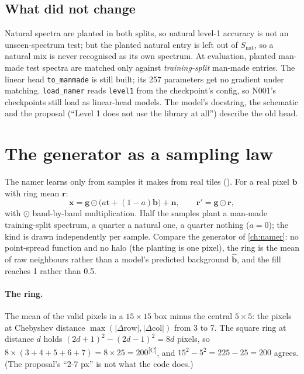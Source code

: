\documentclass[11pt,a4paper,oneside,openany]{book}
\newcommand{\B}[1]{{\symbf{#1}}}
\newcommand{\B}[1]{{\bm{#1}}}
\newcommand{\comp}{\textsuperscript{\textsf{\scriptsize[C]}}}
\newcommand{\vx}{\B{x}}
\newcommand{\vt}{\B{t}}
\newcommand{\vb}{\B{b}}
\newcommand{\vbh}{\hat{\B{b}}}
\newcommand{\vr}{\B{r}}
\newcommand{\vn}{\B{n}}
\newcommand{\vg}{\B{g}}
\begin{document}
\subsection{What did not change}

Natural spectra are planted in both splits, so natural level-1 accuracy is not an unseen-spectrum test; but the planted natural entry is left out of $S_{\mathrm{nat}}$, so a
natural mix is never recognised as its own spectrum. At evaluation, planted man-made test spectra are matched only against \emph{training-split} man-made entries. The linear
head \texttt{to\_manmade} is still built; its 257 parameters get no gradient under matching. \texttt{load\_namer} reads \texttt{level1} from the checkpoint's config, so N001's
checkpoints still load as linear-head models. The model's docstring, the schematic and the proposal (``Level 1 does not use the library at all'') describe the old head.

\section{The generator as a sampling law}

The namer learns only from samples it makes from real tiles (). For a real pixel $\vb$ with ring mean $\vr$:
\begin{equation}
  \vx=\vg\odot\big(a\vt+(1-a)\vb\big)+\vn,\qquad \vr'=\vg\odot\vr ,
  \label{eq:asbuilt:plant}
\end{equation}
with $\odot$ band-by-band multiplication. Half the samples plant a man-made training-split spectrum, a quarter a natural one, a quarter nothing ($a=0$); the kind is drawn
independently per sample. Compare the generator of \cref{ch:namer}: no point-spread function and no halo (the planting is one pixel), the ring is the mean of raw neighbours
rather than a model's predicted background $\vbh$, and the fill reaches 1 rather than 0.5.

\paragraph{The ring.} The mean of the valid pixels in a $15\times15$ box minus the central $5\times5$: the pixels at Chebyshev distance
$\max(|\Delta\text{row}|,|\Delta\text{col}|)$ from 3 to 7. The square ring at distance $d$ holds $(2d+1)^2-(2d-1)^2=8d$ pixels, so
$8\times(3+4+5+6+7)=8\times25=200$\comp, and $15^2-5^2=225-25=200$ agrees. (The proposal's ``2-7 px'' is not what the code does.)
\end{document}
